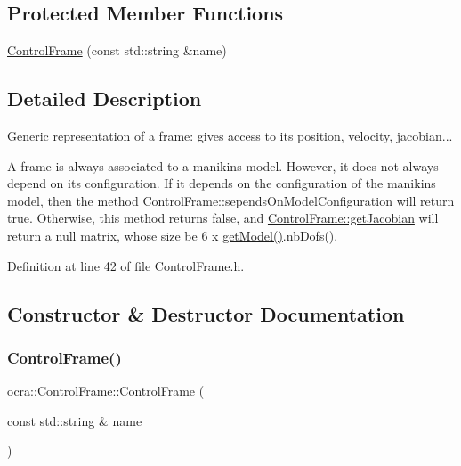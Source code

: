 \subsection*{Protected Member Functions}
\begin{DoxyCompactItemize}
\item 
\hyperlink{classocra_1_1ControlFrame_a8ce978cbe6393c6baa232826c48aec55}{Control\+Frame} (const std\+::string \&name)
\end{DoxyCompactItemize}


\subsection{Detailed Description}
Generic representation of a frame\+: gives access to its position, velocity, jacobian... 

A frame is always associated to a manikin\textquotesingle{}s model. However, it does not always depend on its configuration. If it depends on the configuration of the manikin\textquotesingle{}s model, then the method Control\+Frame\+::sepends\+On\+Model\+Configuration will return true. Otherwise, this method returns false, and \hyperlink{classocra_1_1ControlFrame_a14e0b855979be5dbd360314f25191e77}{Control\+Frame\+::get\+Jacobian} will return a null matrix, whose size be 6 x \hyperlink{classocra_1_1ControlFrame_ab8a1e5e3d96d7524112b4c88bf0bc5ee}{get\+Model()}.nb\+Dofs(). 

Definition at line 42 of file Control\+Frame.\+h.



\subsection{Constructor \& Destructor Documentation}
\hypertarget{classocra_1_1ControlFrame_a8ce978cbe6393c6baa232826c48aec55}{}\label{classocra_1_1ControlFrame_a8ce978cbe6393c6baa232826c48aec55} 
\subsubsection{\texorpdfstring{Control\+Frame()}{ControlFrame()}}
{\footnotesize\ttfamily ocra\+::\+Control\+Frame\+::\+Control\+Frame (\begin{DoxyParamCaption}\item[{const std\+::string \&}]{name }\end{DoxyParamCaption})\hspace{0.3cm}{\ttfamily [protected]}}



